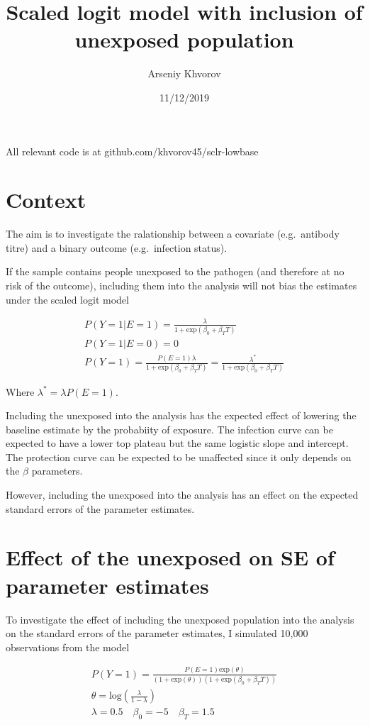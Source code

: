 \documentclass[
]{article}
\title{Scaled logit model with inclusion of unexposed population}
\author{Arseniy Khvorov}
\date{11/12/2019}
\begin{document}
\maketitle

All relevant code is at github.com/khvorov45/sclr-lowbase

\hypertarget{context}{%
\section{Context}\label{context}}

The aim is to investigate the ralationship between a covariate (e.g.~antibody titre) and a binary outcome (e.g.~infection status).

If the sample contains people unexposed to the pathogen (and therefore at no risk of the outcome), including them into the analysis will not bias the estimates under the scaled logit model

\[
\begin{gathered}
P(Y=1|E=1) = \frac{\lambda}{1+\text{exp}(\beta_0+\beta_T T)} \\
P(Y=1|E=0) = 0 \\
P(Y=1) = \frac{P(E=1)\lambda}{1+\text{exp}(\beta_0+\beta_T T)} = \frac{\lambda^*}{1+\text{exp}(\beta_0+\beta_T T)}
\end{gathered}
\]

Where \(\lambda^* = \lambda P(E=1)\).

Including the unexposed into the analysis has the expected effect of lowering the baseline estimate by the probabiity of exposure. The infection curve can be expected to have a lower top plateau but the same logistic slope and intercept. The protection curve can be expected to be unaffected since it only depends on the \(\beta\) parameters.

However, including the unexposed into the analysis has an effect on the expected standard errors of the parameter estimates.

\hypertarget{se}{%
\section{Effect of the unexposed on SE of parameter estimates}\label{se}}

To investigate the effect of including the unexposed population into the analysis on the standard errors of the parameter estimates, I simulated 10,000 observations from the model

\[
\begin{gathered}
P(Y=1) = \frac{P(E=1)\text{exp}(\theta)}{(1+\text{exp}(\theta))(1+\text{exp}(\beta_0+\beta_T T))} \\
\theta = \text{log}(\frac{\lambda}{1-\lambda}) \\
\lambda = 0.5 \quad \beta_0 = -5 \quad \beta_T = 1.5
\end{gathered}
\]
\end{document}
